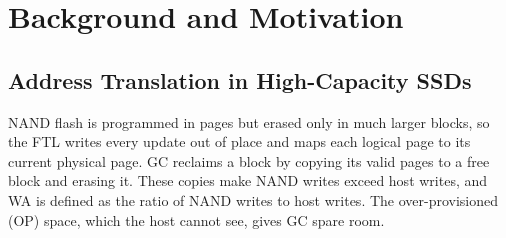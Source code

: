 
\section{Background and Motivation}
\label{sec:bg}

\subsection{Address Translation in High-Capacity SSDs}
% 

NAND flash is programmed in pages but erased only in much larger blocks, so the
FTL writes every update out of place and maps each logical page to its current
physical page. GC reclaims a block by copying its valid pages
to a free block and erasing it. These copies make NAND writes exceed host writes, and WA is defined as the ratio
of NAND writes to host writes. The over-provisioned (OP) space, which the host
cannot see, gives GC spare room.

